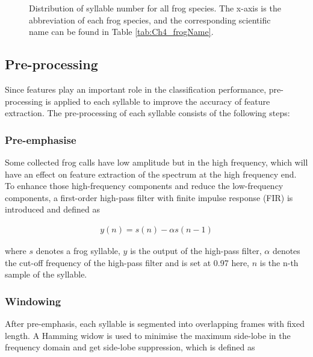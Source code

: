 \begin{figure}[htb!] %
\caption[Distribution of syllable number for all frog species]{Distribution of syllable number for all frog species. The x-axis is the abbreviation of each frog species, and the corresponding scientific name can be found in Table \ref{tab:Ch4_frogName}.}
\label{fig:Ch4_syllable} 
\end{figure}


\subsection{Pre-processing}
Since features play an important role in the classification performance, pre-processing is applied to each syllable to improve the accuracy of feature extraction. The pre-processing of each syllable consists of the following steps:

\subsubsection{Pre-emphasise}
Some collected frog calls have low amplitude but in the high frequency, which will have an effect on feature extraction of the spectrum at the high frequency end. To enhance those high-frequency components and reduce the low-frequency components, a first-order high-pass filter with finite impulse response (FIR) is introduced and defined as

\begin{align}
y(n) = s(n)-\alpha s(n-1)
\end{align}

where $s$ denotes a frog syllable, $y$ is the output of the high-pass filter, $\alpha$ denotes the cut-off frequency of the high-pass filter and is set at 0.97 here, $n$ is the n-th sample of the syllable. 

\subsubsection{Windowing}
After pre-emphasis, each syllable is segmented into overlapping frames with fixed length. A Hamming widow is used to minimise the maximum side-lobe in the frequency domain and get side-lobe suppression, which is defined as

